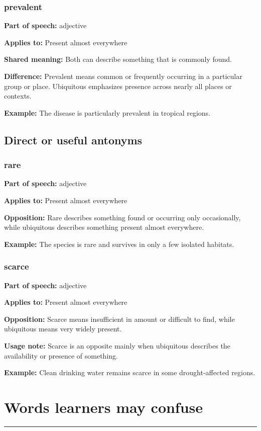 \documentclass[11pt]{article}
\newcommand{\sectionrule}{\par\vspace{-0.5em}\noindent\textcolor{Accent}{\rule{\linewidth}{0.6pt}}\par}
\begin{document}
\subsubsection{prevalent}
\textbf{Part of speech:} adjective

\textbf{Applies to:} Present almost everywhere

\textbf{Shared meaning:} Both can describe something that is commonly found.

\textbf{Difference:} Prevalent means common or frequently occurring in a particular group or place. Ubiquitous emphasizes presence across nearly all places or contexts.

\textbf{Example:} The disease is particularly prevalent in tropical regions.

\subsection{Direct or useful antonyms}
\subsubsection{rare}
\textbf{Part of speech:} adjective

\textbf{Applies to:} Present almost everywhere

\textbf{Opposition:} Rare describes something found or occurring only occasionally, while ubiquitous describes something present almost everywhere.

\textbf{Example:} The species is rare and survives in only a few isolated habitats.

\subsubsection{scarce}
\textbf{Part of speech:} adjective

\textbf{Applies to:} Present almost everywhere

\textbf{Opposition:} Scarce means insufficient in amount or difficult to find, while ubiquitous means very widely present.

\textbf{Usage note:} Scarce is an opposite mainly when ubiquitous describes the availability or presence of something.

\textbf{Example:} Clean drinking water remains scarce in some drought-affected regions.

\section{Words learners may confuse}
\sectionrule
\end{document}
